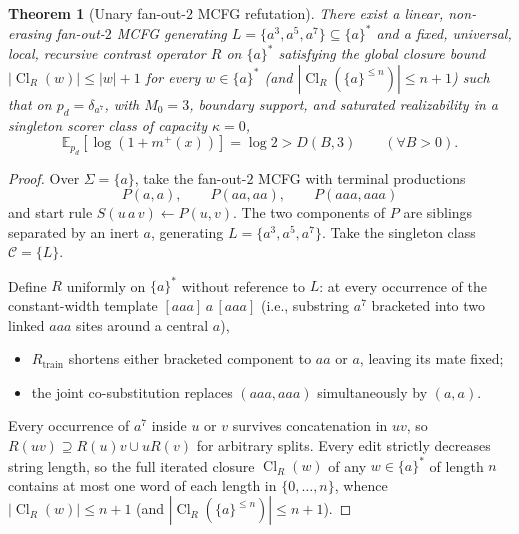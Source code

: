 \documentclass[11pt]{article}
\theoremstyle{plain}
\newtheorem{theorem}{Theorem}
\theoremstyle{definition}
\theoremstyle{remark}
\DeclareMathOperator{\Cl}{Cl}
\begin{document}
\begin{theorem}[Unary fan-out-$2$ MCFG refutation]\label{thm:unary}
There exist a linear, non-erasing fan-out-$2$ MCFG generating $L = \{a^3, a^5, a^7\} \subseteq \{a\}^*$ and a fixed, universal, local, recursive contrast operator $R$ on $\{a\}^*$ satisfying the global closure bound $|\Cl_R(w)| \le |w| + 1$ for every $w \in \{a\}^*$ (and $|\Cl_R(\{a\}^{\le n})| \le n + 1$) such that on $p_d = \delta_{a^7}$, with $M_0 = 3$, boundary support, and saturated realizability in a singleton scorer class of capacity $\kappa = 0$,
\[
\mathbb{E}_{p_d}[\log(1 + m^+(x))] = \log 2 > D(B, 3) \qquad (\forall B > 0).
\]
\end{theorem}

\begin{proof}
Over $\Sigma = \{a\}$, take the fan-out-$2$ MCFG with terminal productions
\[
P(a, a), \qquad P(aa, aa), \qquad P(aaa, aaa)
\]
and start rule $S(u\,a\,v) \leftarrow P(u, v)$. The two components of $P$ are siblings separated by an inert $a$, generating $L = \{a^3, a^5, a^7\}$. Take the singleton class $\mathcal{C} = \{L\}$.

Define $R$ uniformly on $\{a\}^*$ without reference to $L$: at every occurrence of the constant-width template $[aaa]\,a\,[aaa]$ (i.e., substring $a^7$ bracketed into two linked $aaa$ sites around a central $a$),
\begin{itemize}[leftmargin=2em,itemsep=1pt,topsep=3pt]
\item $R_{\mathrm{train}}$ shortens either bracketed component to $aa$ or $a$, leaving its mate fixed;
\item the joint co-substitution replaces $(aaa, aaa)$ simultaneously by $(a, a)$.
\end{itemize}
Every occurrence of $a^7$ inside $u$ or $v$ survives concatenation in $uv$, so $R(uv) \supseteq R(u)v \cup uR(v)$ for arbitrary splits. Every edit strictly decreases string length, so the full iterated closure $\Cl_R(w)$ of any $w \in \{a\}^*$ of length $n$ contains at most one word of each length in $\{0, \dots, n\}$, whence $|\Cl_R(w)| \le n + 1$ (and $|\Cl_R(\{a\}^{\le n})| \le n + 1$).


\end{proof}
\end{document}
